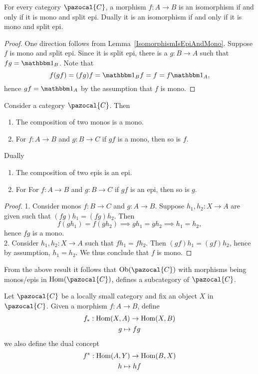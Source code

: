 \begin{lemma}
    For every category $\pazocal{C}$, a morphism $f : A\rightarrow B$ is an isomorphism if and only if it is mono and split epi. Dually it is an isomorphism if and only if it is mono and split epi.
\end{lemma}
\begin{proof}
    One direction follows from Lemma~\ref{IsomorphismIsEpiAndMono}. Suppose $f$ is mono and split epi. Since it is split epi, there is a $g:B\rightarrow A$ such that $fg = \fone_B$. Note that 
    $$f(gf)=(fg)f=\fone_B f= f = f\fone_A,$$
    hence $gf = \fone_A$ by the assumption that $f$ is mono.
\end{proof}
\begin{lemma}
    Consider a category $\pazocal{C}$. Then 
    \begin{enumerate}
        \item The composition of two monos is a mono.
        \item For $f:A\rightarrow B$ and $g : B\rightarrow C$ if $gf$ is a mono, then so is $f$. 
    \end{enumerate}
    Dually 
    \begin{enumerate}
        \item The composition of two epis is an epi.
        \item For For $f:A\rightarrow B$ and $g : B\rightarrow C$ if $gf$ is an epi, then so is $g$.
    \end{enumerate}
\end{lemma}
\begin{proof}
    1. Consider monos $f: B\rightarrow C$ and $g:A\rightarrow B$. Suppose $h_1,h_2 : X\rightarrow A$ are given such that $(fg)h_1 = (fg)h_2$. Then 
    $$f(gh_1)=f(gh_2)\implies gh_1 = gh_2 \implies h_1 =h_2,$$
    hence $fg$ is a mono.\\
    2. Consider $h_1,h_2 : X \rightarrow A$ such that $fh_1 = fh_2$. Then $(gf)h_1 = (gf)h_2$, hence by assumption, $h_1 = h_2$. We thus conclude that $f$ is mono.
\end{proof}
\begin{remark}
    From the above result it follows that $\Ob(\pazocal{C})$ with morphisms being monos/epis in $\Hom(\pazocal{C})$, defines a subcategory of $\pazocal{C}$.
\end{remark}
\begin{definition}
    Let $\pazocal{C}$ be a locally small category and fix an object $X$ in $\pazocal{C}$. Given a morphism $f:A\rightarrow B$, define 
    \begin{gather*}
        f_\ast : \mathrm{Hom}(X,A) \rightarrow \mathrm{Hom}(X,B)\\
        g\mapsto fg
    \end{gather*}  
    we also define the dual concept 
    \begin{gather*}
        f^\ast : \mathrm{Hom}(A,Y) \rightarrow \mathrm{Hom}(B,X)\\
        h\mapsto hf
    \end{gather*}
\end{definition}
